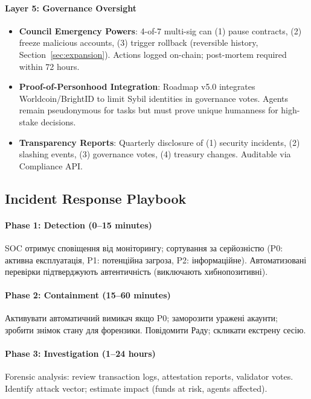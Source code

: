 \documentclass[11pt]{article}
\begin{document}
\paragraph{Layer 5: Governance Oversight}
\begin{itemize}[noitemsep]
  \item \textbf{Council Emergency Powers}: 4-of-7 multi-sig can (1) pause contracts, (2) freeze malicious accounts, (3) trigger rollback (reversible history, Section~\ref{sec:expansion}). Actions logged on-chain; post-mortem required within 72 hours.
  \item \textbf{Proof-of-Personhood Integration}: Roadmap v5.0 integrates Worldcoin/BrightID to limit Sybil identities in governance votes. Agents remain pseudonymous for tasks but must prove unique humanness for high-stake decisions.
  \item \textbf{Transparency Reports}: Quarterly disclosure of (1) security incidents, (2) slashing events, (3) governance votes, (4) treasury changes. Auditable via Compliance API.
\end{itemize}

\subsection{Incident Response Playbook}

\paragraph{Phase 1: Detection (0--15 minutes)}
SOC отримує сповіщення від моніторингу; сортування за серйозністю (P0: активна експлуатація, P1: потенційна загроза, P2: інформаційне). Автоматизовані перевірки підтверджують автентичність (виключають хибнопозитивні).

\paragraph{Phase 2: Containment (15--60 minutes)}
Активувати автоматичний вимикач якщо P0; заморозити уражені акаунти; зробити знімок стану для форензики. Повідомити Раду; скликати екстрену сесію.

\paragraph{Phase 3: Investigation (1--24 hours)}
Forensic analysis: review transaction logs, attestation reports, validator votes. Identify attack vector; estimate impact (funds at risk, agents affected).
\end{document}

